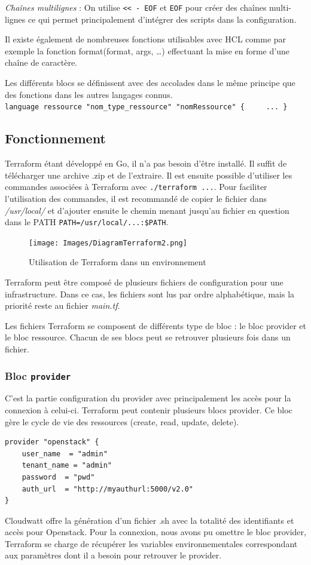 \documentclass[]{article}
\begin{document}
\emph{Chaînes multilignes} : On utilise
\texttt{\textless{}\textless{}\ -\ EOF} et \texttt{EOF} pour créer des
chaînes multi-lignes ce qui permet principalement d'intégrer des scripts
dans la configuration.

Il existe également de nombreuses fonctions utilisables avec HCL comme
par exemple la fonction format(format, args, \ldots{}) effectuant la mise en forme d'une chaîne de caractère.

Les différents blocs se définissent avec des accolades dans le même
principe que des fonctions dans les autres langages connus.
\texttt{language\ ressource\ "nom\_type\_ressource"\ "nomRessource"\ \{\ \ \ \ \ ...\ \}}

\subsection{Fonctionnement}\label{fonctionnement}

Terraform étant développé en Go, il n'a pas besoin d'être installé. Il
suffit de télécharger une archive .zip et de l'extraire. Il est ensuite
possible d'utiliser les commandes associées à Terraform avec
\texttt{./terraform\ ...}. Pour faciliter l'utilisation des commandes,
il est recommandé de copier le fichier dans \emph{/usr/local/} et
d'ajouter ensuite le chemin menant jusqu'au fichier en question dans le
PATH \texttt{PATH=/usr/local/...:\$PATH}.

\begin{figure}
\centering
\texttt{[image: Images/DiagramTerraform2.png]}
\caption{Utilisation de Terraform dans un environnement}
\end{figure}

Terraform peut être composé de plusieurs fichiers de configuration pour
une infrastructure. Dans ce cas, les fichiers sont lus par ordre
alphabétique, mais la priorité reste au fichier \emph{main.tf}.

Les fichiers Terraform se composent de différents type de bloc : le bloc
provider et le bloc ressource. Chacun de ses blocs peut se retrouver
plusieurs fois dans un fichier.

\subsubsection{\texorpdfstring{Bloc
\textbf{\texttt{provider}}}{Bloc provider}}\label{bloc-provider}

C'est la partie configuration du provider avec principalement les accès
pour la connexion à celui-ci. Terraform peut contenir plusieurs blocs
provider. Ce bloc gère le cycle de vie des ressources (create, read,
update, delete).
\begin{verbatim}
provider "openstack" {
    user_name  = "admin"
    tenant_name = "admin"
    password  = "pwd"
    auth_url  = "http://myauthurl:5000/v2.0"
}
\end{verbatim}
Cloudwatt offre la génération d'un fichier .sh avec la totalité des
identifiants et accès pour Openstack. Pour la connexion, nous avons pu
omettre le bloc provider, Terraform se charge de récupérer les variables
environnementales correspondant aux paramètres dont il a besoin pour
retrouver le provider.
\end{document}
